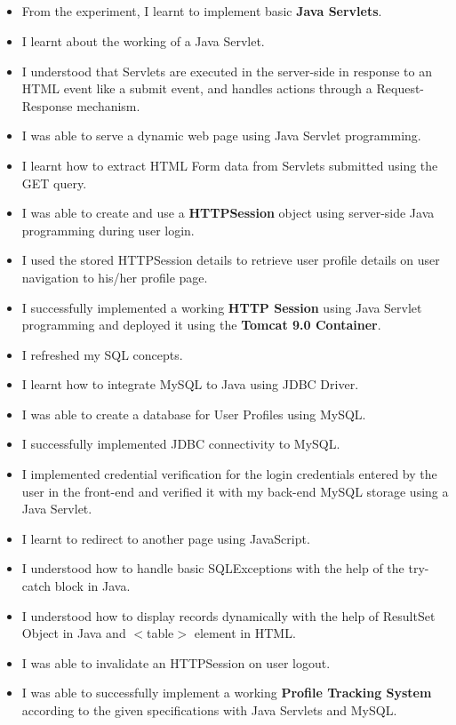 \documentclass[12pt, a4]{article}
\begin{document}
\newpage
\subsection*{}
\begin{itemize}

\item From the experiment, I learnt to implement basic \textbf{Java Servlets}.
\item I learnt about the working of a Java Servlet.
\item I understood that Servlets are executed in the server-side in response to an HTML event like a submit event, and handles actions through a Request-Response mechanism.
\item I was able to serve a dynamic web page using Java Servlet programming.
\item I learnt how to extract HTML Form data from Servlets submitted using the GET query.
\item I was able to create and use a \textbf{HTTPSession} object using server-side Java programming during user login.
\item I used the stored HTTPSession details to retrieve user profile details on user navigation to his/her profile page.
\item I successfully implemented a working \textbf{HTTP Session} using Java Servlet programming and deployed it using the \textbf{Tomcat 9.0 Container}.
\item I refreshed my SQL concepts.
\item I learnt how to integrate MySQL to Java using JDBC Driver.
\item I was able to create a database for User Profiles using MySQL.
\item I successfully implemented JDBC connectivity to MySQL.
\item I implemented credential verification for the login credentials entered by the user in the front-end and verified it with my back-end MySQL storage using a Java Servlet.
\item I learnt to redirect to another page using JavaScript.
\item I understood how to handle basic SQLExceptions with the help of the try-catch block in Java.
\item I understood how to display records dynamically with the help of ResultSet Object in Java and $<$table$>$ element in HTML.
\item I was able to invalidate an HTTPSession on user logout.
\item I was able to successfully implement a working \textbf{Profile Tracking System} according to the given specifications with Java Servlets and MySQL.

\end{itemize}
\end{document}

